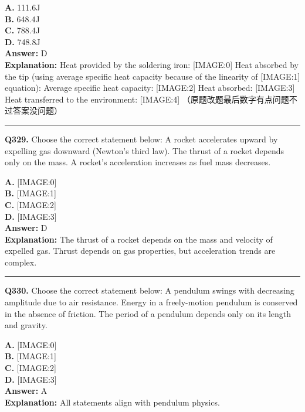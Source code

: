 \documentclass[12pt]{article}
\begin{document}
\textbf{A.} 111.6J \\
\textbf{B.} 648.4J \\
\textbf{C.} 788.4J \\
\textbf{D.} 748.8J \\

\textbf{Answer:} D \\
\textbf{Explanation:} Heat provided by the soldering iron:
[IMAGE:0]
Heat absorbed by the tip (using average specific heat capacity because of the linearity of
[IMAGE:1]
equation):
Average specific heat capacity:
[IMAGE:2]
Heat absorbed:
[IMAGE:3]
Heat transferred to the environment:
[IMAGE:4]
（原题改题最后数字有点问题不过答案没问题）

\hrule
\vspace{1em}


\noindent
\textbf{Q329.} Choose the correct statement below:
A rocket accelerates upward by expelling gas downward (Newton’s third law).
The thrust of a rocket depends only on the mass.
A rocket’s acceleration increases as fuel mass decreases.



\textbf{A.} [IMAGE:0] \\
\textbf{B.} [IMAGE:1] \\
\textbf{C.} [IMAGE:2] \\
\textbf{D.} [IMAGE:3] \\

\textbf{Answer:} D \\
\textbf{Explanation:} The thrust of a rocket depends on the mass and velocity of expelled gas. Thrust depends on gas properties, but acceleration trends are complex.

\hrule
\vspace{1em}


\noindent
\textbf{Q330.} Choose the correct statement below:
A pendulum swings with decreasing amplitude due to air resistance.
Energy in a freely-motion pendulum is conserved in the absence of friction.
The period of a pendulum depends only on its length and gravity.



\textbf{A.} [IMAGE:0] \\
\textbf{B.} [IMAGE:1] \\
\textbf{C.} [IMAGE:2] \\
\textbf{D.} [IMAGE:3] \\

\textbf{Answer:} A \\
\textbf{Explanation:} All statements align with pendulum physics.
\end{document}
